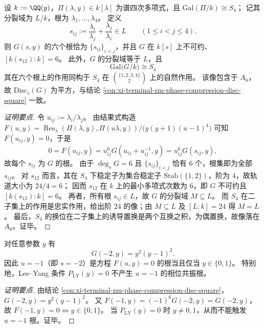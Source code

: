 \begin{conclusion}[压缩六次多项式的二子集表示伽罗瓦像]\label{con:xi-terminal-zm-phase-compression-galois-a6}
设 \(k:=\QQ(y)\)，\(\Pi(\lambda,y)\in k[\lambda]\) 为谱四次多项式，且 \(\mathrm{Gal}(\Pi/k)\cong S_4\)；
记其分裂域为 \(L/k\)，根为 \(\lambda_1,\dots,\lambda_4\)。
定义
\[
s_{ij}:=\frac{\lambda_i}{\lambda_j}+\frac{\lambda_j}{\lambda_i}\in L\qquad (1\le i<j\le4).
\]
则 \(G(s,y)\) 的六个根恰为 \(\{s_{ij}\}_{i<j}\)，并且 \(G\) 在 \(k[s]\) 上不可约、\([k(s_{12}):k]=6\)。
此外，\(G\) 的分裂域等于 \(L\)，且
\[
\mathrm{Gal}\bigl(G/k\bigr)\cong S_4
\]
其在六个根上的作用同构于 \(S_4\) 在 \(\binom{\{1,2,3,4\}}{2}\) 上的自然作用。
该像包含于 \(A_6\)，故 \(\mathrm{Disc}_s(G)\) 为平方，与结论 \ref{con:xi-terminal-zm-phase-compression-disc-square} 一致。
\end{conclusion}
\begin{proof}[证明要点]
令 \(u_{ij}:=\lambda_i/\lambda_j\)。
由结果式构造
\(
F(u,y)=\operatorname{Res}_{\lambda}(\Pi(\lambda,y),\Pi(u\lambda,y))/\bigl(y(y+1)(u-1)^4\bigr)
\)
可知 \(F(u_{ij},y)=0\)，于是
\[
0=F(u_{ij},y)=u_{ij}^{6}G(u_{ij}+u_{ij}^{-1},y)=u_{ij}^{6}G(s_{ij},y),
\]
故每个 \(s_{ij}\) 为 \(G\) 的根。
由于 \(\deg_s G=6\) 且 \(\{s_{ij}\}_{i<j}\) 恰有 \(6\) 个，根集即为全部 \(s_{ij}\)。
对 \(s_{12}\) 而言，其在 \(S_4\) 下稳定子为集合稳定子 \(\mathrm{Stab}(\{1,2\})\)，阶为 \(4\)，故轨道大小为 \(24/4=6\)；
因而 \(s_{12}\) 在 \(k\) 上的最小多项式次数为 \(6\)，即 \(G\) 不可约且 \([k(s_{12}):k]=6\)。
再者，所有根 \(s_{ij}\in L\)，故 \(G\) 的分裂域 \(M\subseteq L\)。
而 \(S_4\) 在二子集上的作用是忠实作用，给出阶 \(24\) 的像；由 \(M\subseteq L\) 及 \([L:k]=24\) 得 \(M=L\)。
最后，\(S_4\) 的换位在二子集上的诱导置换是两个互换之积，为偶置换，故像落在 \(A_6\)。证毕。
\end{proof}

\begin{conclusion}[反相位点 \texorpdfstring{$u=-1$}{u=-1} 的刚性]\label{con:xi-terminal-zm-phase-compression-antiphase-rigidity}
对任意参数 \(y\) 有
\[
G(-2,y)=y^2(y-1)^2.
\]
因此 \(u=-1\)（即 \(s=-2\)）是方程 \(F(u,y)=0\) 的根当且仅当 \(y\in\{0,1\}\)。
特别地，Lee--Yang 条件 \(P_{\mathrm{LY}}(y)=0\) 不产生 \(u=-1\) 的相位共振根。
\end{conclusion}
\begin{proof}[证明要点]
由结论 \ref{con:xi-terminal-zm-phase-compression-disc-square}，\(G(-2,y)=y^2(y-1)^2\)。
又 \(F(-1,y)=(-1)^6G(-2,y)=G(-2,y)\)，故 \(F(-1,y)=0\iff y\in\{0,1\}\)。
当 \(P_{\mathrm{LY}}(y)=0\) 时 \(y\neq 0,1\)，从而不能触发 \(u=-1\) 根。证毕。
\end{proof}

